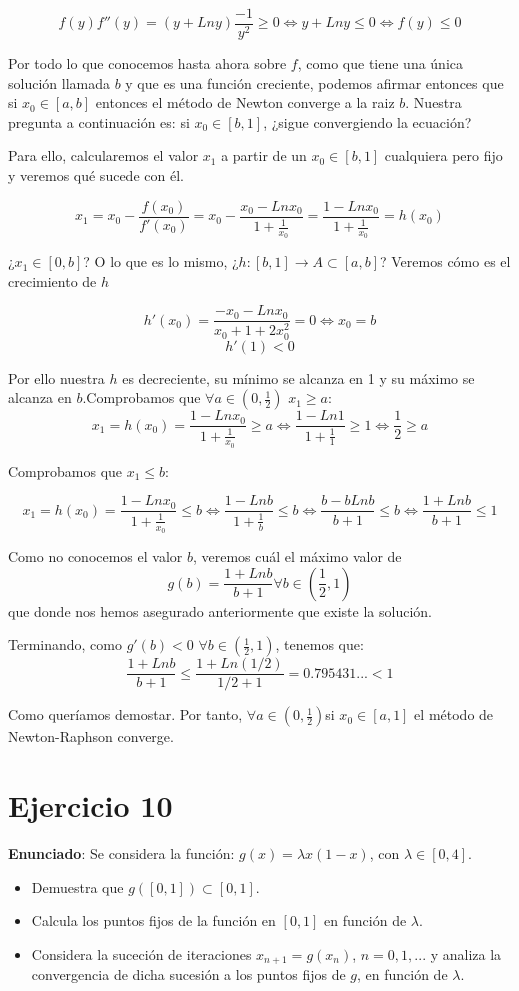 \documentclass[11pt]{article}
\begin{document}
\begin{itemize}
\[
f(y)f''(y)=(y+Lny)\frac{-1}{y^2}\geq 0\iff y+Lny \leq 0 \iff f(y)\leq 0
\]

Por todo lo que conocemos hasta ahora sobre $f$, como que tiene una única solución llamada $b$ y que es una función creciente, podemos afirmar entonces que si $x_0\in[a,b]$ entonces el método de Newton converge a la raiz $b$. Nuestra pregunta a continuación es: si $x_0\in[b,1]$, ¿sigue convergiendo la ecuación?

Para ello, calcularemos el valor $x_1$ a partir de un $x_0\in[b,1]$ cualquiera pero fijo y veremos qué sucede con él.

\[
x_1=x_0-\frac{f(x_0)}{f'(x_0)}=x_0-\frac{x_0-Lnx_0}{1+\frac{1}{x_0}}=\frac{1-Lnx_0}{1+\frac{1}{x_0}}=h(x_0)
\]

¿$x_1\in[0,b]$? O lo que es lo mismo, ¿$h:[b,1]\rightarrow A \subset[a,b]$? Veremos cómo es el crecimiento de $h$

\[
h'(x_0)=\frac{-x_0-Lnx_0}{x_0+1+2x_0^2}=0 \iff x_0=b\]\[
h'(1)<0
\]

Por ello nuestra $h$ es decreciente, su mínimo se alcanza en 1 y su máximo se alcanza en $b$.Comprobamos que $\forall a\in(0,\frac{1}{2})$ $ x_1 \ge a$:
\[
x_1=h(x_0)=\frac{1-Lnx_0}{1+\frac{1}{x_0}}\ge a\iff \frac{1-Ln1}{1+\frac{1}{1}} \geq 1 \iff \frac{1}{2} \ge a 
\]

Comprobamos que $x_1\leq b$:

\[
x_1=h(x_0)=\frac{1-Lnx_0}{1+\frac{1}{x_0}}\leq b \iff \frac{1-Lnb}{1+\frac{1}{b}} \leq b \iff \frac{b-bLnb}{b+1} \leq b \iff \frac{1+Lnb}{b+1} \leq 1
\]

Como no conocemos el valor $b$, veremos cuál el máximo valor de \[g(b)=\frac{1+Lnb}{b+1} \forall b \in (\frac{1}{2},1)\] que donde nos hemos asegurado anteriormente que existe la solución.

Terminando, como $g'(b)<0$ $\forall b \in (\frac{1}{2},1)$, tenemos que:
\[\frac{1+Lnb}{b+1}\leq \frac{1+Ln(1/2)}{1/2+1}=0.795431... < 1\]

Como queríamos demostar. Por tanto, $\forall a\in(0,\frac{1}{2})$si $x_0\in[a,1]$ el método de Newton-Raphson converge.
\end{itemize}

\section{Ejercicio 10}
\textbf{Enunciado}: Se considera la función: $g(x) = \lambda x(1-x)$, con $\lambda \in [0,4]$.
\begin{itemize}
	\item Demuestra que $g([0,1]) \subset [0,1]$.
	\item Calcula los puntos fijos de la función en $[0,1]$ en función de $\lambda$.
	\item Considera la suceción de iteraciones $x_{n+1} = g(x_n)$, $n=0,1,...$ y analiza la convergencia de dicha sucesión a los puntos fijos de $g$, en función de $\lambda$.
\end{itemize}
\end{document}
